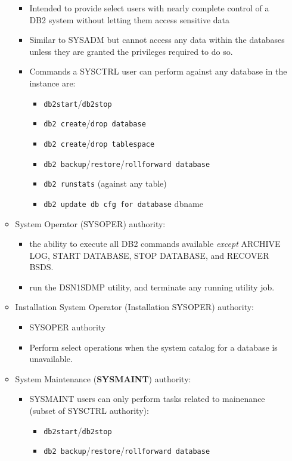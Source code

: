 \documentclass{article}
\begin{document}
\begin{itemize}
\begin{itemize}
\begin{itemize}
	\item Intended to provide select users with nearly complete control of a DB2 system without 
	letting them access sensitive data
	\item Similar to SYSADM but cannot access any data within the databases unless they are
	granted  the privileges required to do so.
	\item Commands a SYSCTRL user can perform against any database in the instance are:
		\begin{itemize}
		\item \texttt{db2start}/\texttt{db2stop}
		\item \texttt{db2 create}/\texttt{drop database}
		\item \texttt{db2 create}/\texttt{drop tablespace}
		\item \texttt{db2 backup}/\texttt{restore}/\texttt{rollforward database}
		\item \texttt{db2 runstats} (against any table)
		\item \texttt{db2 update db cfg for database} dbname
		\end{itemize}
	\end{itemize}
\item System Operator (SYSOPER) authority:
	\begin{itemize}
	\item the ability to execute all DB2 commands available \textit{except} ARCHIVE LOG,
	START DATABASE, STOP DATABASE, and RECOVER BSDS.
	\item run the DSN1SDMP utility, and terminate any running utility job.
	\end{itemize}
\item Installation System Operator (Installation SYSOPER) authority:
	\begin{itemize}
	\item SYSOPER authority
	\item Perform select operations when the system catalog for a database is unavailable.
	\end{itemize}
\item System Maintenance (\textbf{SYSMAINT}) authority:
	\begin{itemize}
	\item SYSMAINT users can only perform tasks related to mainenance (subset of SYSCTRL authority):
		\begin{itemize}
		\item \texttt{db2start}/\texttt{db2stop}
		\item \texttt{db2 backup}/\texttt{restore}/\texttt{rollforward database}

\end{itemize}
\end{itemize}
\end{itemize}
\end{itemize}
\end{document}
